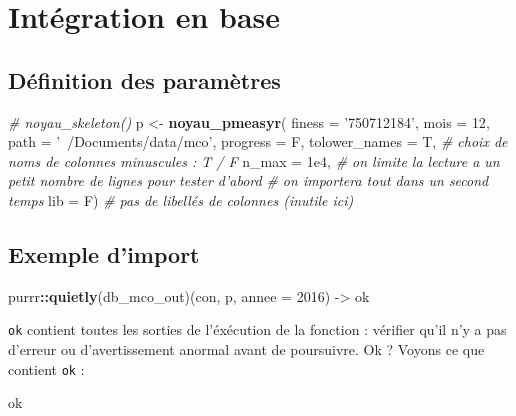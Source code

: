 \documentclass[]{book}
\newenvironment{Shaded}{\begin{snugshade}}{\end{snugshade}}
\newcommand{\CommentTok}[1]{\textcolor[rgb]{0.56,0.35,0.01}{\textit{#1}}}
\newcommand{\DataTypeTok}[1]{\textcolor[rgb]{0.13,0.29,0.53}{#1}}
\newcommand{\DecValTok}[1]{\textcolor[rgb]{0.00,0.00,0.81}{#1}}
\newcommand{\FloatTok}[1]{\textcolor[rgb]{0.00,0.00,0.81}{#1}}
\newcommand{\KeywordTok}[1]{\textcolor[rgb]{0.13,0.29,0.53}{\textbf{#1}}}
\newcommand{\NormalTok}[1]{#1}
\newcommand{\OperatorTok}[1]{\textcolor[rgb]{0.81,0.36,0.00}{\textbf{#1}}}
\newcommand{\StringTok}[1]{\textcolor[rgb]{0.31,0.60,0.02}{#1}}
\begin{document}
\hypertarget{integration-en-base}{%
\section{Intégration en base}\label{integration-en-base}}

\hypertarget{definition-des-parametres}{%
\subsection{Définition des paramètres}\label{definition-des-parametres}}

\begin{Shaded}
\begin{Highlighting}[]
\CommentTok{# noyau_skeleton()}
\NormalTok{p <-}\StringTok{ }\KeywordTok{noyau_pmeasyr}\NormalTok{(}
  \DataTypeTok{finess   =} \StringTok{'750712184'}\NormalTok{,}
  \DataTypeTok{mois     =} \DecValTok{12}\NormalTok{,}
  \DataTypeTok{path     =} \StringTok{'~/Documents/data/mco'}\NormalTok{,}
  \DataTypeTok{progress =}\NormalTok{ F, }
  \DataTypeTok{tolower_names =}\NormalTok{ T, }\CommentTok{# choix de noms de colonnes minuscules : T / F}
  \DataTypeTok{n_max =} \FloatTok{1e4}\NormalTok{, }\CommentTok{# on limite la lecture a un petit nombre de lignes pour tester d'abord }
  \CommentTok{# on importera tout dans un second temps}
  \DataTypeTok{lib =}\NormalTok{ F) }\CommentTok{# pas de libellés de colonnes (inutile ici)}
\end{Highlighting}
\end{Shaded}

\hypertarget{exemple-dimport}{%
\subsection{Exemple d'import}\label{exemple-dimport}}

\begin{Shaded}
\begin{Highlighting}[]
\NormalTok{purrr}\OperatorTok{::}\KeywordTok{quietly}\NormalTok{(db_mco_out)(con,  p, }\DataTypeTok{annee =} \DecValTok{2016}\NormalTok{) ->}\StringTok{ }\NormalTok{ok }
\end{Highlighting}
\end{Shaded}

\texttt{ok} contient toutes les sorties de l'éxécution de la fonction : vérifier qu'il n'y a pas d'erreur ou d'avertissement anormal avant de poursuivre. Ok ? Voyons ce que contient \texttt{ok} :

\begin{Shaded}
\begin{Highlighting}[]
\NormalTok{ok}
\end{Highlighting}
\end{Shaded}
\end{document}
